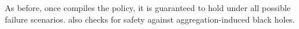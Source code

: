 As before, once \sysname compiles the policy, it is guaranteed to hold under all possible failure scenarios. \sysname also checks for safety against aggregation-induced black holes.









%
%
%
%
%
%
%
